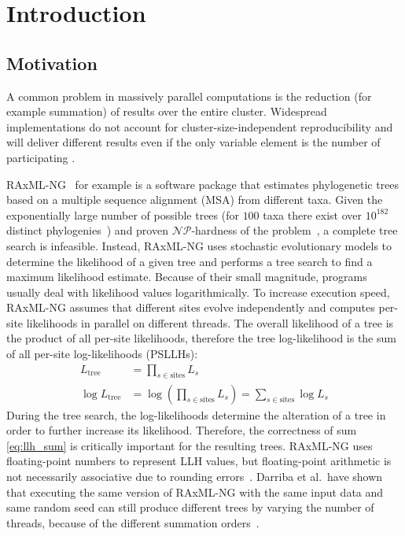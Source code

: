 \chapter{Introduction}
\label{ch:Introduction}

\section{Motivation}
\label{sec:Motivation}
A common problem in massively parallel computations is the reduction (for example summation) of results over the entire cluster.
Widespread implementations do not account for cluster-size-independent reproducibility and will deliver different results
even if the only variable element is the number of participating .

RAxML-NG~\cite{kozlov_raxml-ng_2019-1} for example is a software package that estimates phylogenetic trees based on a multiple sequence alignment (MSA) from different taxa.
Given the exponentially large number of possible trees (for $100$ taxa there exist over $10^{182}$ distinct phylogenies~\cite{stamatakis_efficient_2020}) and proven $\mathcal{NP}$-hardness of the problem~\cite{roch_short_2006}, a complete tree search is infeasible.
Instead, RAxML-NG uses stochastic evolutionary models to determine the likelihood of a given tree and performs a tree search to find a maximum likelihood estimate.
Because of their small magnitude, programs usually deal with likelihood values logarithmically.
To increase execution speed, RAxML-NG assumes that different sites evolve independently and computes per-site likelihoods in parallel on different threads.
The overall likelihood of a tree is the product of all per-site likelihoods, therefore the tree log-likelihood is the sum of all per-site log-likelihoods (PSLLHs):
\begin{align}
L_{\textrm{tree}} &= \prod_{s \in \textrm{sites}} L_s \\
\label{eq:llh_sum}
\log L_{\textrm{tree}} &= \log (\prod_{s \in \textrm{sites}} L_s) = \sum_{s \in \textrm{sites}}  \log L_s
\end{align}
During the tree search, the log-likelihoods determine the alteration of a tree in order to further increase its likelihood.
Therefore, the correctness of sum \eqref{eq:llh_sum} is critically important for the resulting trees.
RAxML-NG uses floating-point numbers to represent LLH values, but floating-point arithmetic is not necessarily associative due to rounding errors~\cite{goldberg_what_1991}.
Darriba et al.\ have shown that executing the same version of RAxML-NG with the same input data and same random seed can still produce different trees by varying the number of threads, because of the different summation orders~\cite{darriba_state_2018}.
